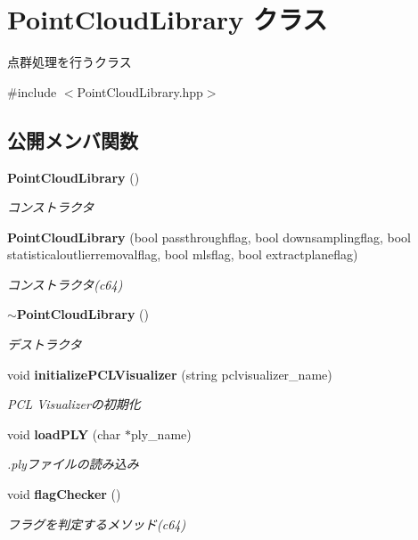 \section{Point\-Cloud\-Library クラス}
\label{class_point_cloud_library}


点群処理を行うクラス  




{\ttfamily \#include $<$Point\-Cloud\-Library.\-hpp$>$}

\subsection*{公開メンバ関数}
\begin{DoxyCompactItemize}
\item 
{\bf Point\-Cloud\-Library} ()
\begin{DoxyCompactList}\small\item\em コンストラクタ \end{DoxyCompactList}\item 
{\bf Point\-Cloud\-Library} (bool passthroughflag, bool downsamplingflag, bool statisticaloutlierremovalflag, bool mlsflag, bool extractplaneflag)
\begin{DoxyCompactList}\small\item\em コンストラクタ(c64) \end{DoxyCompactList}\item 
{\bf $\sim$\-Point\-Cloud\-Library} ()
\begin{DoxyCompactList}\small\item\em デストラクタ \end{DoxyCompactList}\item 
void {\bf initialize\-P\-C\-L\-Visualizer} (string pclvisualizer\-\_\-name)
\begin{DoxyCompactList}\small\item\em P\-C\-L Visualizerの初期化 \end{DoxyCompactList}\item 
void {\bf load\-P\-L\-Y} (char $\ast$ply\-\_\-name)
\begin{DoxyCompactList}\small\item\em .plyファイルの読み込み \end{DoxyCompactList}\item 
void {\bf flag\-Checker} ()
\begin{DoxyCompactList}\small\item\em フラグを判定するメソッド(c64) \end{DoxyCompactList}\item 

\end{DoxyCompactItemize}
